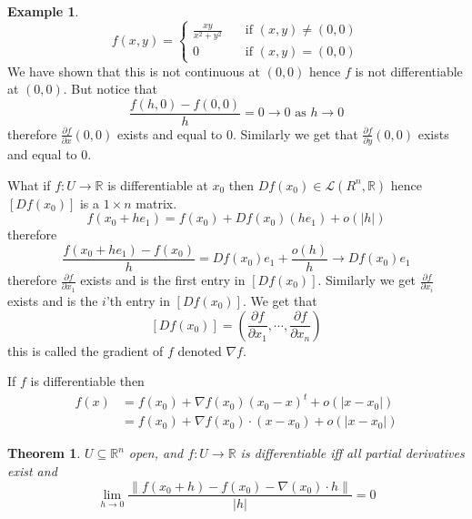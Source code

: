 \documentclass[11pt,a4paper]{article}
\theoremstyle{definition}
\newtheorem{example}[definition]{Example}
\theoremstyle{plain}
\newtheorem{theorem}[definition]{Theorem}
\theoremstyle{remark}
\newcommand{\R}{\mathbb{R}}
\newcommand{\norm}[1]{\lVert #1 \rVert}
\begin{document}
\begin{example}
    $$f(x,y) = \begin{cases}
        \frac{xy}{x^2 + y^2} \quad &\text{if } (x,y) \ne (0,0) \\
        0 \quad &\text{if } (x,y) = (0,0)
    \end{cases}$$
    We have shown that this is not continuous at $(0,0)$ hence $f$ is not differentiable at $(0,0)$. But notice that 
    $$\frac{f(h,0) - f(0,0)}{h} = 0 \to 0 \text{ as $h \to 0$}$$
    therefore $\frac{\partial f}{\partial x} (0,0)$ exists and equal to $0$. Similarly we get that 
    $\frac{\partial f}{\partial y} (0,0)$ exists and equal to $0$. 
\end{example}

What if $f \colon U \to \R$ is differentiable at $x_0$ then $Df(x_0) \in \mathcal{L}(R^n, \R)$ hence $[Df(x_0)]$ is a $1 \times n$ matrix. 
$$f(x_0 + he_1) = f(x_0) + Df(x_0) (he_1) + o(|h|)$$
therefore 
$$\frac{f(x_0 + he_1) - f(x_0)}{h} = Df(x_0) e_1 + \frac{o(h)}{h} \to Df(x_0) e_1$$
therefore $\frac{\partial f}{\partial x_1}$ exists and is the first entry in $[Df(x_0)]$. Similarly we get $\frac{\partial f}{\partial x_i}$ exists and is the $i$'th entry in 
$[Df(x_0)]$. We get that 
$$[Df(x_0)] = (\frac{\partial f}{\partial x_1}, \cdots, \frac{\partial f}{\partial x_n})$$
this is called the gradient of $f$ denoted $\nabla f$. 

If $f$ is differentiable then  
\begin{align*}
    f(x) &= f(x_0) + \nabla f(x_0) (x_0 - x)^t + o(|x-x_0|) \\
    &= f(x_0) + \nabla f(x_0) \cdot (x-x_0) + o(|x-x_0|)
\end{align*}

\begin{theorem}
    $U \subseteq \R^n$ open, and $f \colon U \to \R$ is differentiable iff all partial derivatives exist and 
    $$\lim_{h \to 0} \frac{\norm{f(x_0 + h) - f(x_0) - \nabla (x_0) \cdot h}}{|h|} = 0$$
\end{theorem}
\end{document}
